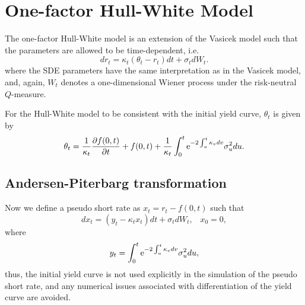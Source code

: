 \section{One-factor Hull-White Model}
The one-factor Hull-White model \cite{Hull1990} is an extension of the Vasicek model such that the parameters are allowed to be time-dependent, i.e.
\begin{equation}
dr_t = \kappa_t \left( \theta_t - r_t \right) dt + \sigma_t dW_t. \label{eq:HullWhiteSDE}
\end{equation}
where the SDE parameters have the same interpretation as in the Vasicek model, and, again, $W_t$ denotes a one-dimensional Wiener process under the risk-neutral $Q$-measure.

For the Hull-White model to be consistent with the initial yield curve, $\theta_t$ is given by \cite{Andersen2010}
\begin{equation}
\theta_t = \frac{1}{\kappa_t} \frac{\partial f(0,t)}{\partial t} + f(0,t) + \frac{1}{\kappa_t} \int_0^t \text{e}^{-2\int_u^t \kappa_v dv} \sigma_u^2 du.
\end{equation}

\subsection{Andersen-Piterbarg transformation}
Now we define a pseudo short rate as $x_t = r_t - f(0,t)$ such that
\begin{equation}
dx_t = \left( y_t - \kappa_t x_t \right) dt + \sigma_t dW_t, \;\;\; x_0 = 0,
\label{eq:HullWhiteSDEx}
\end{equation}
where
\begin{equation}
y_t = \int_0^t \text{e}^{-2\int_u^t \kappa_v dv} \sigma_u^2 du,
\end{equation}
thus, the initial yield curve is not used explicitly in the simulation of the pseudo 
short rate, and any numerical issues associated with differentiation of the yield curve are avoided.

